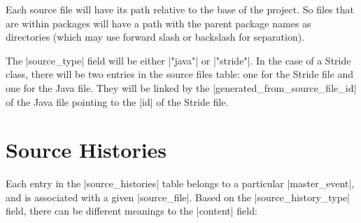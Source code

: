 \documentclass{report}
\begin{document}
Each source file will have its path relative to the base of the
project.  So files that are within packages will have a path with the
parent package names as directories (which may use forward slash or
backslash for separation).

The |source_type| field will be either |"java"| or |"stride"|.
In the case of a Stride class, there will be two entries in the source files
table: one for the Stride file and one for the Java file.  They will be linked
by the |generated_from_source_file_id| of the Java file pointing to the |id| of the
 Stride file.

\section{Source Histories}


Each entry in the |source_histories| table belongs to a particular
|master_event|, and is associated with a given |source_file|.  Based on the
|source_history_type| field, there can be different meanings to the |content| field:
\end{document}
